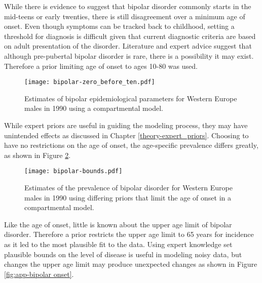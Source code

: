While there is evidence to suggest that bipolar disorder commonly
starts in the mid-teens or early twenties, there is still disagreement
over a minimum age of onset. Even though symptoms can be tracked back
to childhood, setting a threshold for diagnosis is difficult given
that current diagnostic criteria are based on adult presentation of
the disorder. Literature and expert advice suggest that although
pre-pubertal bipolar disorder is rare, there is a possibility it may
exist. \cite{kloos_bipolar_2011, angst_historical_2000} Therefore a
prior limiting age of onset to ages 10-80 was used.

    \begin{figure}[h]
        \begin{center}
            \texttt{[image: bipolar-zero\_before\_ten.pdf]}
            \caption{Estimates of bipolar epidemiological parameters for
              Western Europe males in 1990 using a compartmental
              model.}
            \label{fig:app-bipolar fit}
        \end{center}
    \end{figure}

While expert priors are useful in guiding the modeling process, they
may have unintended effects as discussed in Chapter
\ref{theory-expert_priors}.  Choosing to have no restrictions on the
age of onset, the age-specific prevalence differs greatly, as shown in
Figure \ref{fig:app-bipolar bounds}.

    \begin{figure}[h]
        \begin{center}
            \texttt{[image: bipolar-bounds.pdf]}
            \caption{Estimates of the prevalence of bipolar disorder
              for Western Europe males in 1990 using differing priors
              that limit the age of onset in a compartmental model.}
            \label{fig:app-bipolar bounds}
        \end{center}
    \end{figure}

Like the age of onset, little is known about the upper age limit of
bipolar disorder.  Therefore a prior restricts the upper age limit to
65 years for incidence as it led to the most plausible fit to the
data.  Using expert knowledge set plausible bounds on the level of
disease is useful in modeling noisy data, but changes the upper age
limit may produce unexpected changes as shown in Figure
\ref{fig:app-bipolar onset}.

